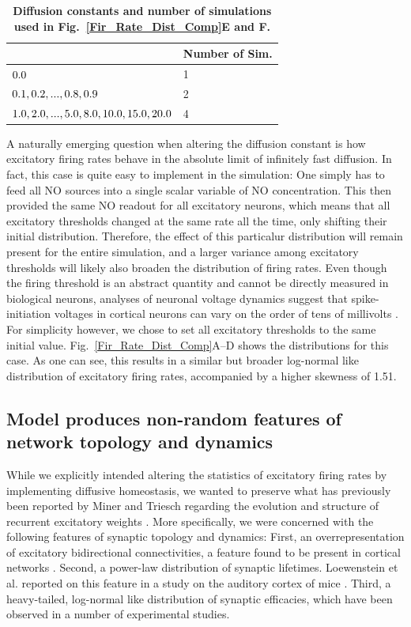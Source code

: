 \documentclass[10pt,letterpaper]{article}
\begin{document}
\begin{table}
\caption{\bf Diffusion constants and number of simulations used in Fig.~\ref{Fir_Rate_Dist_Comp}E and F.}
\begin{tabu}{|l|l|}
\hline
{} & \textbf{Number of Sim.} \\ \hline
$\rm 0.0$ & 1 \\ \hline
$\rm 0.1,0.2,...,0.8,0.9$ & 2 \\ \hline
$\rm 1.0,2.0,...,5.0,8.0,10.0,15.0,20.0$ & 4 \\ \hline
\end{tabu}
\label{Diff_Test_Constants_Sim_Number}
\end{table}

A naturally emerging question when altering the diffusion constant is how excitatory firing rates behave in the absolute limit of infinitely fast diffusion. In fact, this case is quite easy to implement in the simulation: One simply has to feed all NO sources into a single scalar variable of NO concentration. This then provided the same NO readout for all excitatory neurons, which means that all excitatory thresholds changed at the same rate all the time, only shifting their initial distribution. Therefore, the effect of this particalur distribution will remain present for the entire simulation, and a larger variance among excitatory thresholds will likely also broaden the distribution of firing rates. Even though the firing threshold is an abstract quantity and cannot be directly measured in biological neurons, analyses of neuronal voltage dynamics suggest that spike-initiation voltages in cortical neurons can vary on the order of tens of millivolts \cite{Azouz_2000, Jolivet_2006}. For simplicity however, we chose to set all excitatory thresholds to the same initial value. Fig.~\ref{Fir_Rate_Dist_Comp}A--D shows the distributions for this case. As one can see, this results in a similar but broader log-normal like distribution of excitatory firing rates, accompanied by a higher skewness of 1.51.

\subsection*{Model produces non-random features of network topology and dynamics}\label{Section_Topol_Preservation}
While we explicitly intended altering the statistics of excitatory firing rates by implementing diffusive homeostasis, we wanted to preserve what has previously been reported by Miner and Triesch regarding the evolution and structure of recurrent excitatory weights \cite{SORN_Paper}. More specifically, we were concerned with the following features of synaptic topology and dynamics: First, an overrepresentation of excitatory bidirectional connectivities, a feature found to be present in cortical networks \cite{Song_Connectivity_2005}. Second, a power-law distribution of synaptic lifetimes. Loewenstein et al. reported on this feature in a study on the auditory cortex of mice \cite{Loewenstein_2015}. Third, a heavy-tailed, log-normal like distribution of synaptic efficacies, which have been observed in a number of experimental studies\cite{Song_Connectivity_2005,Yasumatsu_Synapses_2008,Lefort_2009,Loewenstein_Spine_Sizes}.
\end{document}
